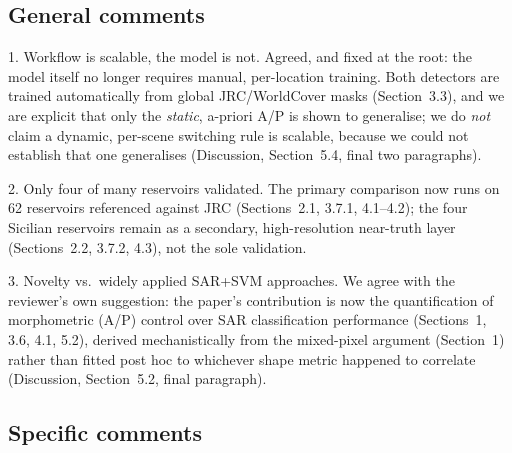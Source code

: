 \documentclass[11pt]{article}
\begin{document}
\subsection*{General comments}

\begin{resp}
  \item[1. Workflow is scalable, the model is not.] Agreed, and fixed at the
  root: the model itself no longer requires manual, per-location training.
  Both detectors are trained automatically from global JRC/WorldCover masks
  (Section~3.3), and we are explicit that only the \emph{static}, a-priori A/P
  is shown to generalise; we do \emph{not} claim a dynamic, per-scene
  switching rule is scalable, because we could not establish that one
  generalises (Discussion, Section~5.4, final two paragraphs).
  \item[2. Only four of many reservoirs validated.] The primary comparison
  now runs on 62 reservoirs referenced against JRC (Sections~2.1, 3.7.1,
  4.1--4.2); the four Sicilian reservoirs remain as a secondary,
  high-resolution near-truth layer (Sections~2.2, 3.7.2, 4.3), not the sole
  validation.
  \item[3. Novelty vs.\ widely applied SAR+SVM approaches.] We agree with the
  reviewer's own suggestion: the paper's contribution is now the
  quantification of morphometric (A/P) control over SAR classification
  performance (Sections~1, 3.6, 4.1, 5.2), derived mechanistically from the
  mixed-pixel argument (Section~1) rather than fitted post hoc to whichever
  shape metric happened to correlate (Discussion, Section~5.2, final
  paragraph).
\end{resp}

\subsection*{Specific comments}
\end{document}
